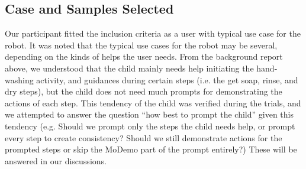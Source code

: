 \subsection{Case and Samples Selected}
\label{sec:CaseSamplesSelected}
Our participant fitted the inclusion criteria as a user with typical use case for the robot.  It was noted that the typical use cases for the robot may be several, depending on the kinds of helps the user needs.  From the background report above, we understood that the child mainly needs help initiating the hand-washing activity, and guidances during certain steps (i.e. the get soap, rinse, and dry steps), but the child does not need much prompts for demonstrating the actions of each step.  This tendency of the child was verified during the trials, and we attempted to answer the question ``how best to prompt the child'' given this tendency (e.g. Should we prompt only the steps the child needs help, or prompt every step to create consistency?  Should we still demonstrate actions for the prompted steps or skip the MoDemo part of the prompt entirely?)  These will be answered in our discussions.

